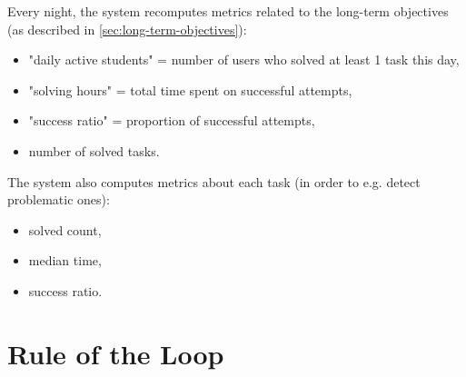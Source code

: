 Every night, the system recomputes metrics related to the long-term objectives
(as described in \ref{sec:long-term-objectives}):

\begin{itemize}
\item "daily active students" = number of users who solved at least 1 task this day,
\item "solving hours" = total time spent on successful attempts,
\item "success ratio" = proportion of successful attempts,
\item number of solved tasks.
\end{itemize}


The system also computes metrics about each task (in order to e.g. detect problematic ones):
\begin{itemize}
\item solved count,
\item median time,
\item success ratio.
\end{itemize}




%


\section{Rule of the Loop}
\label{sec:robomission.rule-of-the-loop}

